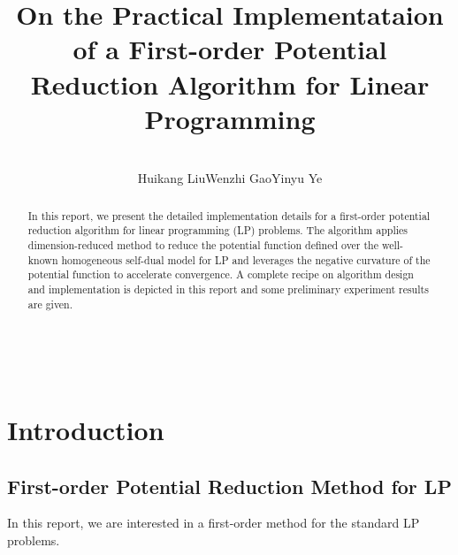 \documentclass{article}
\newcommand{\tmaffiliation}[1]{\\ #1}
\newcommand{\0}{\textbf{0}}
\begin{document}
\title{On the Practical Implementataion of a First-order Potential Reduction
Algorithm for Linear Programming}

\author{
  \tmaffiliation{Huikang Liu\qquad  Wenzhi Gao\qquad Yinyu Ye}
}

\maketitle

\begin{abstract}
  In this report, we present the detailed implementation details for a
  first-order potential reduction algorithm for linear programming (LP)
  problems. The algorithm applies dimension-reduced method to reduce the
  potential function defined over the well-known homogeneous self-dual model
  for LP and leverages the negative curvature of the potential function to
  accelerate convergence. A complete recipe on algorithm design and
  implementation is depicted in this report and some preliminary experiment
  results are given.
\end{abstract}

\

\section{Introduction}

\subsection{First-order Potential Reduction Method for LP}

In this report, we are interested in a first-order method for the standard LP
problems.
\end{document}
